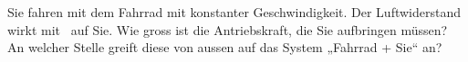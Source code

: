 Sie fahren mit dem Fahrrad mit konstanter Geschwindigkeit. Der Luftwiderstand wirkt mit \FLwO\ auf Sie. Wie gross ist die Antriebskraft, die Sie aufbringen müssen? An welcher Stelle greift diese von aussen auf das System „Fahrrad + Sie“ an?
